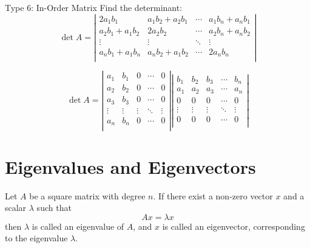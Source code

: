 \documentclass{beamer}
\begin{document}
\begin{frame}{Type 6: In-Order Matrix}
Find the determinant:
\begin{equation*}
    \det A=\left| \begin{matrix}
        2a_1b_1&		a_1b_2+a_2b_1&		\cdots&		a_1b_n+a_nb_1\\
        a_2b_1+a_1b_2&		2a_2b_2&		\cdots&		a_2b_n+a_nb_2\\
        \vdots&		\vdots&		\ddots&		\vdots\\
        a_nb_1+a_1b_n&		a_nb_2+a_1b_2&		\cdots&		2a_nb_n\\
    \end{matrix} \right|
\end{equation*}

\begin{equation*}
    \det A=\left| \begin{matrix}
        a_1&		b_1&		0&		\cdots&		0\\
        a_2&		b_2&		0&		\cdots&		0\\
        a_3&		b_3&		0&		\cdots&		0\\
        \vdots&		\vdots&		\vdots&		\ddots&		\vdots\\
        a_n&		b_n&		0&		\cdots&		0\\
    \end{matrix} \right|\left| \begin{matrix}
        b_1&		b_2&		b_3&		\cdots&		b_n\\
        a_1&		a_2&		a_3&		\cdots&		a_n\\
        0&		0&		0&		\cdots&		0\\
        \vdots&		\vdots&		\vdots&		\ddots&		\vdots\\
        0&		0&		0&		\cdots&		0\\
    \end{matrix} \right|
\end{equation*}
\end{frame}

\section{Eigenvalues and Eigenvectors}
\begin{definition}
    Let $A$ be a square matrix with degree $n$. If there exist a non-zero vector $x$ and a scalar $\lambda$ such that
    \begin{equation}
        Ax=\lambda x
    \end{equation}
    then $\lambda$ is called an eigenvalue of $A$, and $x$ is called an eigenvector, corresponding to the eigenvalue $\lambda$.
\end{definition}
\end{document}
